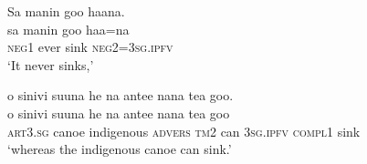 \ea\label{ex:text18-52}
Sa manin goo haana.\\
\gll sa	manin	goo	haa=na\\
     \textsc{neg}1	ever	sink	\textsc{neg}2=3\textsc{sg}.\textsc{ipfv}\\
\glt `It never sinks,'
\z

\ea\label{ex:text18-53}
o sinivi suuna he na antee nana tea goo.\\
\gll o	sinivi	suuna	he	na	antee	nana	tea	goo\\
     \textsc{art}3.\textsc{sg}	canoe	indigenous	\textsc{advers}	\textsc{tm}2	can	3\textsc{sg}.\textsc{ipfv}	\textsc{compl}1	sink\\
\glt `whereas the indigenous canoe can sink.'
\z
